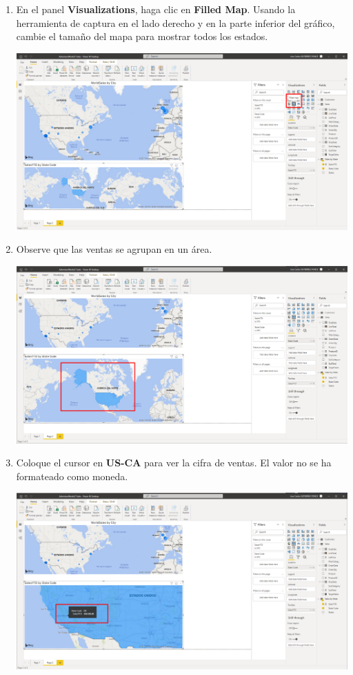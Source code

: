 \documentclass[12pt,letterpaper]{article}
\newcommand\tab[1][1cm]{\hspace*{#1}}
\begin{document}
\begin{enumerate}[\tab 1.]
\begin{center}
        \end{center}
        \item En el panel \textbf{Visualizations}, haga clic en \textbf{Filled Map}. Usando la herramienta de captura en el lado derecho y en la parte inferior del gráfico, cambie el tamaño del mapa para mostrar todos los estados.
        \begin{center}
            \includegraphics[width=13cm]{./img/img128.png}
        \end{center}
        \item Observe que las ventas se agrupan en un área.
        \begin{center}
            \includegraphics[width=13cm]{./img/img129.png}
        \end{center}
        \item Coloque el cursor en \textbf{US-CA} para ver la cifra de ventas. El valor no se ha formateado como moneda.
        \begin{center}
            \includegraphics[width=13cm]{./img/img130.png}

\end{center}
\end{enumerate}
\end{document}
